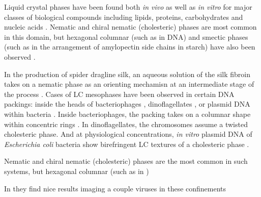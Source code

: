 Liquid crystal phases have been found both \textit{in vivo} as well as \textit{in vitro}  for major classes of biological compounds including lipids, proteins, carbohydrates and nucleic acids \cite{hamley2010}. Nematic and chiral nematic (cholesteric) phases are most common in this domain, but hexagonal columnar (such as in DNA) and smectic phases (such as in the arrangement of amylopectin side chains in starch) have also been observed \cite{hamley2010}. 

In the production of spider dragline silk, an aqueous solution of the silk fibroin takes on a nematic phase as an orienting mechamisn at an intermediate stage of the process \cite{spidersilk1, spidersilk2, spidersilk3}. 
Cases of LC mesophases have been observed in certain DNA packings: inside the heads of bacteriophages \cite{earnshaw1980dna}, dinoflagellates \cite{livolant1978}, or plasmid DNA within bacteria \cite{reich1994liquid}.
Inside bacteriophages, the packing takes on a columnar shape within concentric rings \cite{cerritelli1997encapsidated}. In dinoflagellates, the chromosomes assume a twisted cholesteric phase. And at physiological concentrations, \textit{in vitro} plasmid DNA of \textit{Escherichia coli} bacteria show birefringent LC textures of a cholesteric phase \cite{reich1994liquid}.

Nematic and chiral nematic (cholesteric) phases are the most common in such systems, but hexagonal columnar (such as in ) \cite{hamley2010}


In \cite{lewis2014} they find nice results imaging a couple viruses in these confinements



